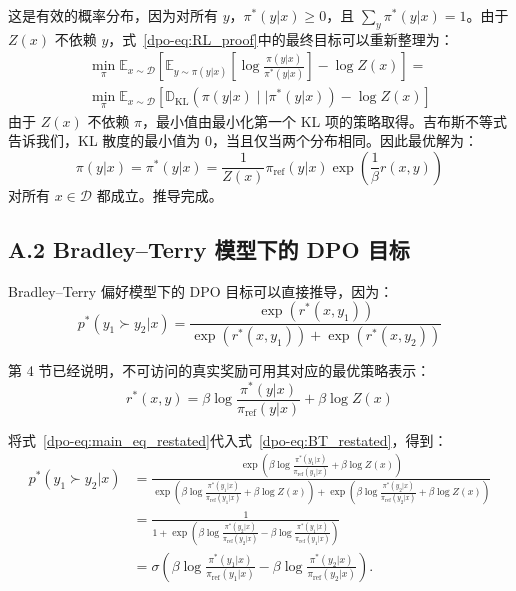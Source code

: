 这是有效的概率分布，因为对所有 $y$，$\pi^*(y|x)\geq0$，且 $\sum_y\pi^*(y|x)=1$。由于 $Z(x)$ 不依赖 $y$，式~\ref{dpo-eq:RL_proof}中的最终目标可以重新整理为：
\begin{align}\label{dpo-display-16}
\min_{\pi}  \mathbb{E}_{x\sim \mathcal{D}}\left[\mathbb{E}_{y\sim \pi(y|x)}\left[\log\frac{\pi(y|x)}{\pi^*(y|x)}\right] - \log Z(x)\right]=\\
\min_{\pi}\mathbb{E}_{x\sim\mathcal{D}}\left[\mathbb{D}_{\text{KL}}(\pi(y|x)\mid\mid\pi^*(y|x)) - \log Z(x)\right]
\end{align}
由于 $Z(x)$ 不依赖 $\pi$，最小值由最小化第一个 KL 项的策略取得。吉布斯不等式告诉我们，KL 散度的最小值为 0，当且仅当两个分布相同。因此最优解为：
\begin{equation}\label{dpo-display-17}
    \pi(y|x)= \pi^*(y|x) = \frac{1}{Z(x)}\pi_{\mathrm{ref}}(y|x)\exp\left(\frac{1}{\beta}r(x, y)\right)
\end{equation}
对所有 $x\in\mathcal D$ 都成立。推导完成。

\label{dpo-app:derivation1}



\subsection*{A.2 Bradley--Terry 模型下的 DPO 目标}
Bradley--Terry 偏好模型下的 DPO 目标可以直接推导，因为：
\begin{equation}\label{dpo-eq:BT_restated}
    p^*(y_1\succ y_2|x)=\frac{\exp\left(r^*(x, y_1)\right)}{\exp\left(r^*(x, y_1)\right) + \exp\left(r^*(x, y_2)\right)}
\end{equation}

第 4 节已经说明，不可访问的真实奖励可用其对应的最优策略表示：
\begin{equation}\label{dpo-eq:main_eq_restated}
    r^*(x,y) =\beta \log \frac{\pi^*(y|x)}{\pi_{\mathrm{ref}}(y|x)} + \beta \log Z(x)
\end{equation}

将式~\ref{dpo-eq:main_eq_restated}代入式~\ref{dpo-eq:BT_restated}，得到：
\label{dpo-display-20}
\begin{align*}
    p^*(y_1\succ y_2|x)&=\frac{\exp\left(\beta \log \frac{\pi^*(y_1|x)}{\pi_{\mathrm{ref}}(y_1|x)} + \beta \log Z(x)\right)}{\exp\left(\beta \log \frac{\pi^*(y_1|x)}{\pi_{\mathrm{ref}}(y_1|x)} + \beta \log Z(x)\right) + \exp\left(\beta \log \frac{\pi^*(y_2|x)}{\pi_{\mathrm{ref}}(y_2|x)} + \beta \log Z(x)\right)}\\ &=
    \frac{1}{1+\exp\left(\beta \log \frac{\pi^*(y_2|x)}{\pi_{\mathrm{ref}}(y_2|x)}-\beta \log \frac{\pi^*(y_1|x)}{\pi_{\mathrm{ref}}(y_1|x)}\right)} \\&= \sigma\left(\beta \log \frac{\pi^*(y_1|x)}{\pi_{\mathrm{ref}}(y_1|x)} - \beta \log \frac{\pi^*(y_2|x)}{\pi_{\mathrm{ref}}(y_2|x)}\right).
\end{align*}

